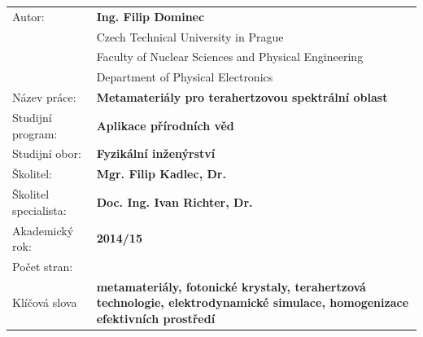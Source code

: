 \bgroup {}
\noindent\begin{tabular}{p{.25\linewidth}p{.7\linewidth}}
Autor:					&\textbf{Ing. Filip Dominec} \\
					~	&Czech Technical University in Prague\\
					~	&Faculty of Nuclear Sciences and Physical Engineering\\ 
					~	&Department of Physical Electronics\\
Název práce:			&\textbf{Metamateriály pro terahertzovou spektrální oblast} \\
Studijní program:		&\textbf{Aplikace přírodních věd} \\
Studijní obor:			&\textbf{Fyzikální inženýrství} \\
Školitel:				&\textbf{Mgr. Filip Kadlec, Dr.} \\
Školitel specialista:	&\textbf{Doc. Ing. Ivan Richter, Dr.} \\
Akademický rok:			&\textbf{2014/15} \\			%
Počet stran:			&\textbf{\pageref{enddocument}} \\  %
Klíčová slova			&\textbf{metamateriály, fotonické krystaly, terahertzová technologie, elektrodynamické simulace, homogenizace efektivních prostředí} \\
\end{tabular}
\egroup

\thispagestyle{empty} \newpage

